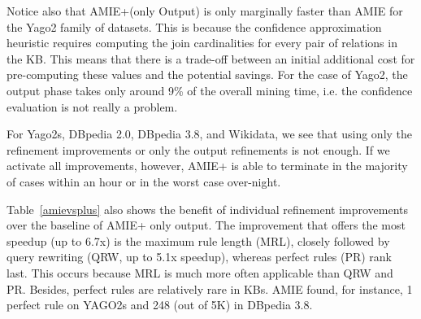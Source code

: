 Notice also that AMIE+(only Output) is only marginally faster than AMIE for the Yago2 family of datasets. This is because the confidence approximation heuristic requires  
computing the join cardinalities for every pair of relations in the KB. This means that there is a trade-off between an initial additional cost 
for pre-computing these values and the potential savings. For the case of Yago2, the output phase takes only around 9\% 
of the overall mining time, i.e. the
confidence evaluation is not really a problem. %


For Yago2s, DBpedia 2.0, DBpedia 3.8, and Wikidata, we see that using only the refinement improvements 
or only the output refinements is not enough.  
If we activate all improvements, however, AMIE+ is able to terminate in the 
majority of cases within an hour or in the worst case over-night.

Table~\ref{amievsplus} also shows the benefit of individual refinement improvements over the baseline of AMIE+ only output. 
The improvement that offers the most speedup (up to 6.7x) is the maximum rule length (MRL), closely followed by query rewriting (QRW, up to 5.1x speedup),
whereas perfect rules (PR) rank last. 
This occurs because MRL is much more often applicable than QRW and PR. 
Besides, perfect rules are relatively rare in KBs. AMIE found, for instance, 1 perfect rule on YAGO2s and 248 (out of 5K) in DBpedia 3.8. 





